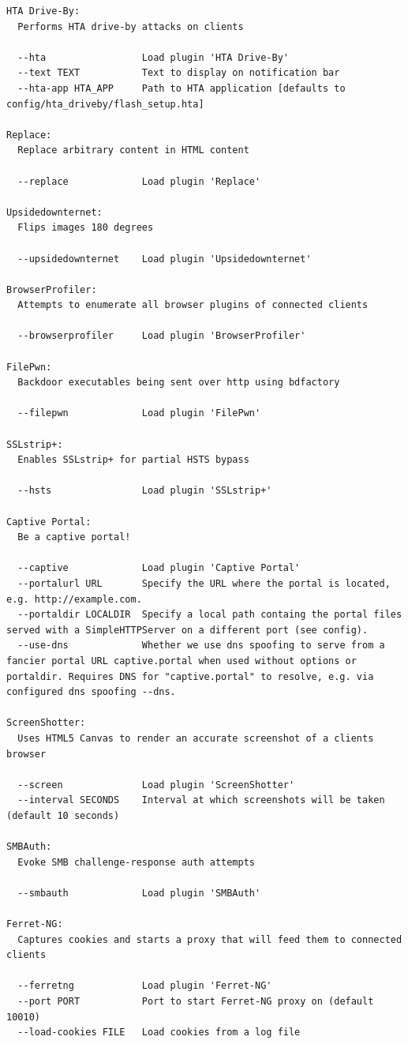 \documentclass{article}
\begin{document}
\begin{lstlisting}
HTA Drive-By:
  Performs HTA drive-by attacks on clients

  --hta                 Load plugin 'HTA Drive-By'
  --text TEXT           Text to display on notification bar
  --hta-app HTA_APP     Path to HTA application [defaults to config/hta_driveby/flash_setup.hta]

Replace:
  Replace arbitrary content in HTML content

  --replace             Load plugin 'Replace'

Upsidedownternet:
  Flips images 180 degrees

  --upsidedownternet    Load plugin 'Upsidedownternet'

BrowserProfiler:
  Attempts to enumerate all browser plugins of connected clients

  --browserprofiler     Load plugin 'BrowserProfiler'

FilePwn:
  Backdoor executables being sent over http using bdfactory

  --filepwn             Load plugin 'FilePwn'

SSLstrip+:
  Enables SSLstrip+ for partial HSTS bypass

  --hsts                Load plugin 'SSLstrip+'

Captive Portal:
  Be a captive portal!

  --captive             Load plugin 'Captive Portal'
  --portalurl URL       Specify the URL where the portal is located, e.g. http://example.com.
  --portaldir LOCALDIR  Specify a local path containg the portal files served with a SimpleHTTPServer on a different port (see config).
  --use-dns             Whether we use dns spoofing to serve from a fancier portal URL captive.portal when used without options or portaldir. Requires DNS for "captive.portal" to resolve, e.g. via configured dns spoofing --dns.

ScreenShotter:
  Uses HTML5 Canvas to render an accurate screenshot of a clients browser

  --screen              Load plugin 'ScreenShotter'
  --interval SECONDS    Interval at which screenshots will be taken (default 10 seconds)

SMBAuth:
  Evoke SMB challenge-response auth attempts

  --smbauth             Load plugin 'SMBAuth'

Ferret-NG:
  Captures cookies and starts a proxy that will feed them to connected clients

  --ferretng            Load plugin 'Ferret-NG'
  --port PORT           Port to start Ferret-NG proxy on (default 10010)
  --load-cookies FILE   Load cookies from a log file


\end{lstlisting}
\end{document}
